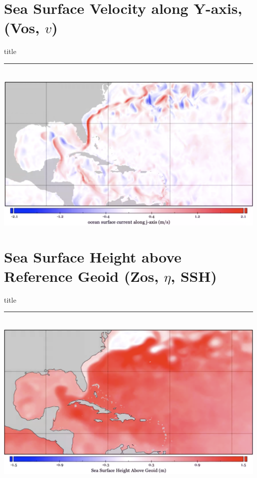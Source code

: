 \section{Sea Surface Velocity along Y-axis, (Vos, $v$) }
    \begin{frame}[plain]
        \vfill
      \centering
      \begin{beamercolorbox}[sep=8pt,center,shadow=true,rounded=true]{title}
        \insertsectionhead\par%
        \color{oxfordblue}\noindent\rule{10cm}{1pt} \\
        \includegraphics[width=0.93\linewidth]{images/example-images/vos.png}
      \end{beamercolorbox}
      \vfill
  \end{frame}

\section{Sea Surface Height above Reference Geoid (Zos, $\eta$, SSH) }
    \begin{frame}[plain]
        \vfill
      \centering
      \begin{beamercolorbox}[sep=8pt,center,shadow=true,rounded=true]{title}
        \insertsectionhead\par%
        \color{oxfordblue}\noindent\rule{10cm}{1pt} \\
        \includegraphics[width=0.93\linewidth]{images/example-images/zos-image.png}
      \end{beamercolorbox}
      \vfill
  \end{frame}

